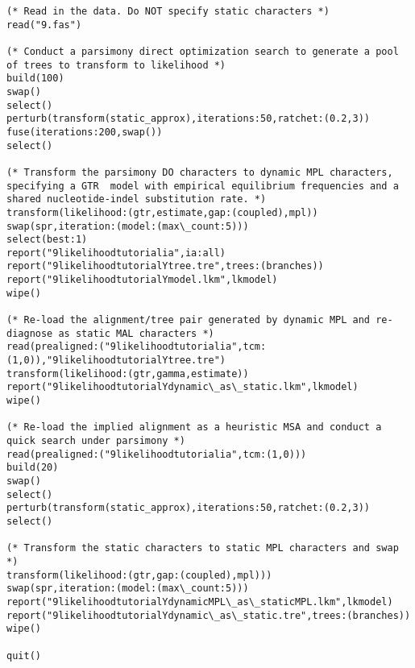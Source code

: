 \begin{verbatim}
(* Read in the data. Do NOT specify static characters *)
read("9.fas")

(* Conduct a parsimony direct optimization search to generate a pool of trees to transform to likelihood *)
build(100)
swap()
select()
perturb(transform(static_approx),iterations:50,ratchet:(0.2,3))
fuse(iterations:200,swap())
select()

(* Transform the parsimony DO characters to dynamic MPL characters, specifying a GTR  model with empirical equilibrium frequencies and a shared nucleotide-indel substitution rate. *)
transform(likelihood:(gtr,estimate,gap:(coupled),mpl))
swap(spr,iteration:(model:(max\_count:5)))
select(best:1)
report("9likelihoodtutorialia",ia:all)
report("9likelihoodtutorialYtree.tre",trees:(branches))
report("9likelihoodtutorialYmodel.lkm",lkmodel)
wipe()

(* Re-load the alignment/tree pair generated by dynamic MPL and re-diagnose as static MAL characters *)
read(prealigned:("9likelihoodtutorialia",tcm:(1,0)),"9likelihoodtutorialYtree.tre")
transform(likelihood:(gtr,gamma,estimate))
report("9likelihoodtutorialYdynamic\_as\_static.lkm",lkmodel)
wipe()

(* Re-load the implied alignment as a heuristic MSA and conduct a quick search under parsimony *)
read(prealigned:("9likelihoodtutorialia",tcm:(1,0)))
build(20)
swap()
select()
perturb(transform(static_approx),iterations:50,ratchet:(0.2,3))
select()

(* Transform the static characters to static MPL characters and swap *)
transform(likelihood:(gtr,gap:(coupled),mpl)))
swap(spr,iteration:(model:(max\_count:5)))
report("9likelihoodtutorialYdynamicMPL\_as\_staticMPL.lkm",lkmodel)
report("9likelihoodtutorialYdynamic\_as\_static.tre",trees:(branches))
wipe()

quit()
\end{verbatim}

